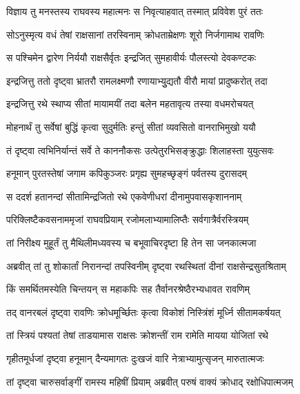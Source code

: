 
\twolineshloka
{विज्ञाय तु मनस्तस्य राघवस्य महात्मनः}
{स निवृत्याहवात् तस्मात् प्रविवेश पुरं ततः} %

\twolineshloka
{सोऽनुस्मृत्य वधं तेषां राक्षसानां तरस्विनाम्}
{क्रोधताम्रेक्षणः शूरो निर्जगामाथ रावणिः} %

\twolineshloka
{स पश्चिमेन द्वारेण निर्ययौ राक्षसैर्वृतः}
{इन्द्रजित् सुमहावीर्यः पौलस्त्यो देवकण्टकः} %

\twolineshloka
{इन्द्रजित्तु ततो दृष्ट्वा भ्रातरौ रामलक्ष्मणौ}
{रणायाभ्युुद्यतौ वीरौ मायां प्रादुष्करोत् तदा} %

\twolineshloka
{इन्द्रजित्तु रथे स्थाप्य सीतां मायामयीं तदा}
{बलेन महतावृत्य तस्या वधमरोचयत्} %

\twolineshloka
{मोहनार्थं तु सर्वेषां बुद्धिं कृत्वा सुदुर्मतिः}
{हन्तुं सीतां व्यवसितो वानराभिमुखो ययौ} %

\twolineshloka
{तं दृष्ट्वा त्वभिनिर्यान्तं सर्वे ते काननौकसः}
{उत्पेतुरभिसङ्क्रुद्धाः शिलाहस्ता युयुत्सवः} %

\twolineshloka
{हनूमान् पुरतस्तेषां जगाम कपिकुञ्जरः}
{प्रगृह्य सुमहच्छृङ्गं पर्वतस्य दुरासदम्} %

\twolineshloka
{स ददर्श हतानन्दां सीतामिन्द्रजितो रथे}
{एकवेणीधरां दीनामुपवासकृशाननाम्} %

\twolineshloka
{परिक्लिष्टैकवसनाममृजां राघवप्रियाम्}
{रजोमलाभ्यामालिप्तैः सर्वगात्रैर्वरस्त्रियम्} %

\twolineshloka
{तां निरीक्ष्य मुहूर्तं तु मैथिलीमध्यवस्य च}
{बभूवाचिरदृष्टा हि तेन सा जनकात्मजा} %

\twolineshloka
{अब्रवीत् तां तु शोकार्तां निरानन्दां तपस्विनीम्}
{दृष्ट्वा रथस्थितां दीनां राक्षसेन्द्रसुतश्रिताम्} %

\twolineshloka
{किं समर्थितमस्येति चिन्तयन् स महाकपिः}
{सह तैर्वानरश्रेष्ठैरभ्यधावत रावणिम्} %

\twolineshloka
{तद् वानरबलं दृष्ट्वा रावणिः क्रोधमूर्च्छितः}
{कृत्वा विकोशं निस्त्रिंशं मूर्ध्नि सीतामकर्षयत्} %

\twolineshloka
{तां स्त्रियं पश्यतां तेषां ताडयामास राक्षसः}
{क्रोशन्तीं राम रामेति मायया योजितां रथे} %

\twolineshloka
{गृहीतमूर्धजां दृष्ट्वा हनूमान् दैन्यमागतः}
{दुःखजं वारि नेत्राभ्यामुत्सृजन् मारुतात्मजः} %

\twolineshloka
{तां दृष्ट्वा चारुसर्वाङ्गीं रामस्य महिषीं प्रियाम्}
{अब्रवीत् परुषं वाक्यं क्रोधाद् रक्षोधिपात्मजम्} %

